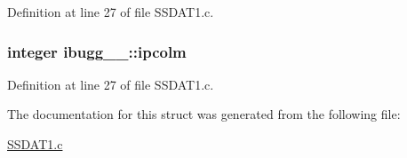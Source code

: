 Definition at line 27 of file S\+S\+D\+A\+T1.\+c.

\subsubsection[{\texorpdfstring{ipcolm}{ipcolm}}]{\setlength{\rightskip}{0pt plus 5cm}integer ibugg\+\_\+\_\+\+::ipcolm}\hypertarget{structibugg__1___a1f6512285f507b49fb0e8360911da705}{}\label{structibugg__1___a1f6512285f507b49fb0e8360911da705}


Definition at line 27 of file S\+S\+D\+A\+T1.\+c.



The documentation for this struct was generated from the following file\+:\begin{DoxyCompactItemize}
\item 
\hyperlink{SSDAT1_8c}{S\+S\+D\+A\+T1.\+c}\end{DoxyCompactItemize}
